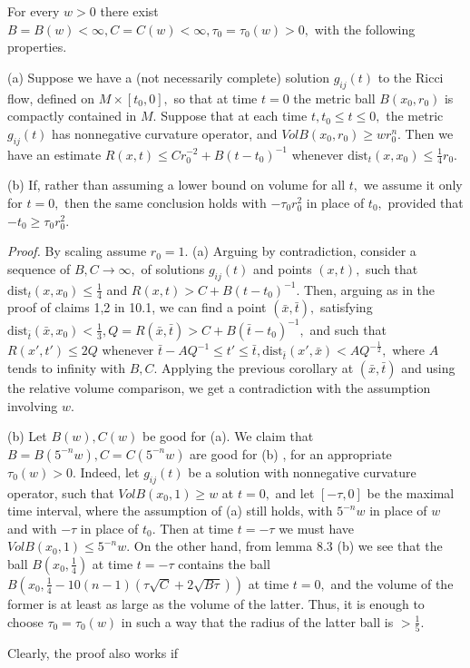 \documentclass[12pt]{article}
\newcommand{\bx}{\bar{x}}
\newcommand{\bt}{\bar{t}}
\theoremstyle{plain}
{\swapnumbers
\newtheorem{thm}{Theorem}[section]
\newtheorem{cor}[thm]{Corollary}
\newtheorem{lem}[thm]{Lemma}
\newtheorem{prop}[thm]{Proposition}
}
\theoremstyle{definition}
{\swapnumbers
\newtheorem{defn}[thm]{Definition}
\newtheorem{nota}[thm]{Notation}
\newtheorem{parag}[thm]{}
\newtheorem*{parstr}{\addtocounter{thm}{1}\thesection.\arabic{thm}*}
\newtheorem*{intropar}{\addtocounter{thm}{1}\arabic{thm}}
}
\theoremstyle{remark} {\swapnumbers
\newtheorem{rem}[thm]{Remark}
\newtheorem{exam}[thm]{Example}
\newtheorem{lemma}[thm]{Lemma}
\newtheorem{claim}[thm]{Claim}
}
\numberwithin{equation}{section}
\begin{document}
  \begin{cor}   For every $w>0$ there exist $B=B(w)<\infty ,
  C=C(w)<\infty , \tau_0=\tau_0(w)>0,$ with the following properties.
  \par (a) Suppose we have a (not necessarily complete) solution
  $g_{ij}(t)$ to the Ricci flow, defined on $M\times [t_0,0],$ so
  that at time $t=0$ the metric ball $B(x_0,r_0)$ is compactly
  contained in $M.$ Suppose that at each time $t, t_0\le t\le 0,$
  the metric $g_{ij}(t)$ has nonnegative curvature operator, and
  $VolB(x_0,r_0)\ge wr_0^n.$ Then we have an estimate $R(x,t)\le
  Cr_0^{-2}+B(t-t_0)^{-1}$ whenever $\mbox{dist}_t(x,x_0)\le
  \frac{1}{4}r_0.$ \par (b) If, rather than assuming a lower bound
  on volume for all $t,$ we
 assume it only for $t=0,$ then the same conclusion holds with
 $-\tau_0r_0^2$ in place of $t_0,$ provided that $-t_0\ge
 \tau_0r_0^2.$\end{cor} {\it Proof.}  By scaling assume $r_0=1.$ (a) Arguing
 by contradiction, consider a sequence of $B,C\to \infty,$ of
 solutions $g_{ij}(t)$ and points $(x,t),$ such that
 $\mbox{dist}_t(x,x_0)\le \frac{1}{4}$ and $ R(x,t)> C+
 B(t-t_0)^{-1}.$ Then, arguing as in the proof of claims 1,2 in
 10.1, we can find a point $(\bx,\bt),$ satisfying
 $\mbox{dist}_{\bt}(\bx,x_0)<\frac{1}{3},
 Q=R(\bx,\bt)>C+B(\bt-t_0)^{-1},$ and such that $R(x',t')\le 2Q$
 whenever $\bt-AQ^{-1}\le t'\le \bt,
 \mbox{dist}_{\bt}(x',\bx)<AQ^{-\frac{1}{2}},$ where $A$ tends to
 infinity with $B,C.$ Applying the previous corollary at
 $(\bx,\bt)$ and using the relative volume comparison, we get a
 contradiction with the assumption involving $w.$ \par (b) Let
 $B(w),C(w)$ be good for (a). We claim that
 $B=B(5^{-n}w),C=C(5^{-n}w)$ are good for (b) , for an appropriate
 $\tau_0(w)>0.$ Indeed, let $g_{ij}(t)$ be a solution with
 nonnegative curvature operator, such that $VolB(x_0,1)\ge w$ at
 $t=0,$ and let $[-\tau ,0]$ be the maximal time interval, where
 the assumption of (a) still holds, with $5^{-n}w$ in place of $w$ and with $-\tau$ in
 place of $t_0.$ Then at time $t=-\tau$ we must have
 $VolB(x_0,1)\le 5^{-n}w.$ On the other hand, from lemma 8.3 (b)
 we see that the ball $B(x_0,\frac{1}{4})$ at time $t=-\tau$
 contains the ball
 $B(x_0,\frac{1}{4}-10(n-1)(\tau\sqrt{C}+2\sqrt{B\tau})) $ at time
 $t=0,$ and the volume of the former is at least as large as the
 volume of the latter. Thus, it is enough to choose
 $\tau_0=\tau_0(w)$ in such a way that the radius of the latter
 ball is $>\frac{1}{5}.$ \par Clearly, the proof also works if
\end{document}
